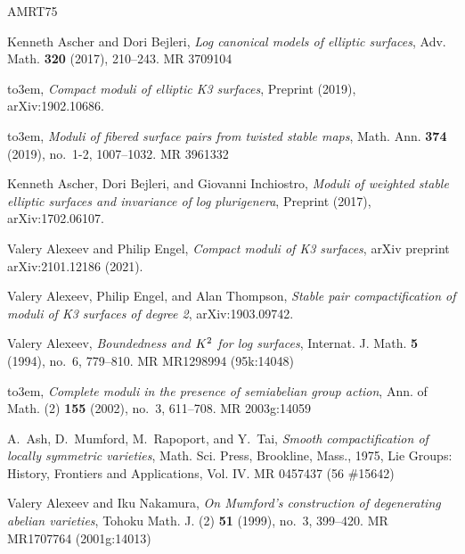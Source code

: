 \documentclass[table,x11names]{amsart}
\begin{document}
\def\cprime{$'$}
\providecommand{\bysame}{\leavevmode\hbox to3em{\hrulefill}\thinspace}
\providecommand{\MR}{\relax\ifhmode\unskip\space\fi MR }
\providecommand{\MRhref}[2]{%
  \href{http://www.ams.org/mathscinet-getitem?mr=#1}{#2}
}
\providecommand{\href}[2]{#2}
\begin{thebibliography}{AMRT75}

Kenneth Ascher and Dori Bejleri, \emph{Log canonical models of elliptic
  surfaces}, Adv. Math. \textbf{320} (2017), 210--243. \MR{3709104}

\bysame, \emph{Compact moduli of elliptic {K3} surfaces}, Preprint (2019),
  arXiv:1902.10686.

\bysame, \emph{Moduli of fibered surface pairs from twisted stable maps}, Math.
  Ann. \textbf{374} (2019), no.~1-2, 1007--1032. \MR{3961332}

Kenneth Ascher, Dori Bejleri, and Giovanni Inchiostro, \emph{Moduli of weighted
  stable elliptic surfaces and invariance of log plurigenera}, Preprint (2017),
  arXiv:1702.06107.

Valery Alexeev and Philip Engel, \emph{Compact moduli of {K}3 surfaces}, arXiv
  preprint arXiv:2101.12186 (2021).

Valery Alexeev, Philip Engel, and Alan Thompson, \emph{Stable pair
  compactification of moduli of {K3} surfaces of degree 2}, arXiv:1903.09742.

Valery Alexeev, \emph{Boundedness and {$K\sp 2$} for log surfaces}, Internat.
  J. Math. \textbf{5} (1994), no.~6, 779--810. \MR{MR1298994 (95k:14048)}

\bysame, \emph{{C}omplete moduli in the presence of semiabelian group action},
  Ann. of Math. (2) \textbf{155} (2002), no.~3, 611--708. \MR{2003g:14059}

A.~Ash, D.~Mumford, M.~Rapoport, and Y.~Tai, \emph{Smooth compactification of
  locally symmetric varieties}, Math. Sci. Press, Brookline, Mass., 1975, Lie
  Groups: History, Frontiers and Applications, Vol. IV. \MR{0457437 (56
  \#15642)}

Valery Alexeev and Iku Nakamura, \emph{{O}n {M}umford's construction of
  degenerating abelian varieties}, Tohoku Math. J. (2) \textbf{51} (1999),
  no.~3, 399--420. \MR{MR1707764 (2001g:14013)}


\end{thebibliography}
\end{document}
